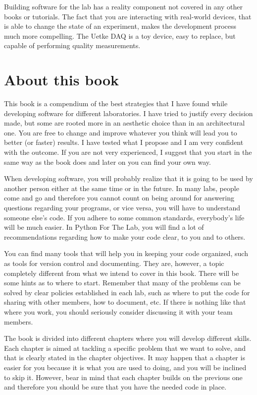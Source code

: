 Building software for the lab has a reality component not covered in any other books or tutorials. The fact that you are interacting with real-world devices, that is able to change the state of an experiment, makes the development process much more compelling. The Uetke DAQ is a toy device, easy to replace, but capable of performing quality measurements. 

\section{About this book}
This book is a compendium of the best strategies that I have found while developing software for different laboratories. I have tried to justify every decision made, but some are rooted more in an aesthetic choice than in an architectural one. You are free to change and improve whatever you think will lead you to better (or faster) results. I have tested what I propose and I am very confident with the outcome. If you are not very experienced, I suggest that you start in the same way as the book does and later on you can find your own way.

When developing software, you will probably realize that it is going to be used by another person either at the same time or in the future. In many labs, people come and go and therefore you cannot count on being around for answering questions regarding your programs, or vice versa, you will have to understand someone else’s code. If you adhere to some common standards, everybody’s life will be much easier. In Python For The Lab, you will find a lot of recommendations regarding how to make your code clear, to you and to others.

You can find many tools that will help you in keeping your code organized, such as tools for version control and documenting. They are, however, a topic completely different from what we intend to cover in this book. There will be some hints as to where to start. Remember that many of the problems can be solved by clear policies established in each lab, such as where to put the code for sharing with other members, how to document, etc. If there is nothing like that where you work, you should seriously consider discussing it with your team members.

The book is divided into different chapters where you will develop different skills. Each chapter is aimed at tackling a specific problem that we want to solve, and that is clearly stated in the chapter objectives. It may happen that a chapter is easier for you because it is what you are used to doing, and you will be inclined to skip it. However, bear in mind that each chapter builds on the previous one and therefore you should be sure that you have the needed code in place.

